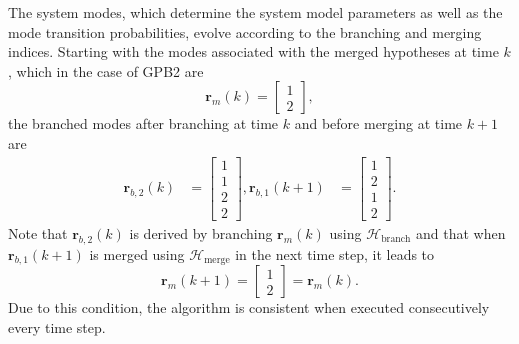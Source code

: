 {%
The system modes, which determine the system model parameters as well as the mode transition probabilities, evolve according to the branching and merging indices. Starting with the modes associated with the merged hypotheses at time $k$, which in the case of GPB2 are
%
\begin{equation} \label{eq:rmk_GPB2}
		\mathbf{r}_m(k) = \begin{bmatrix} 1 \\ 2 \end{bmatrix},
\end{equation}
the branched modes after branching at time $k$ and before merging at time $k+1$ are
%
%
\begin{equation} \label{eq:rbk_GPB2}
	\begin{aligned}
		\mathbf{r}_{b,2}(k) &= \begin{bmatrix} 1 \\ 1 \\ 2 \\ 2 \end{bmatrix},
		\mathbf{r}_{b,1}(k+1) &= \begin{bmatrix} 1 \\ 2 \\ 1 \\ 2 \end{bmatrix}.
	\end{aligned}
\end{equation}
Note that $\mathbf{r}_{b,2}(k)$ is derived by branching $\mathbf{r}_m(k)$ using $\mathcal{H}_{\text{branch}}$ and that when $\mathbf{r}_{b,1}(k+1)$ is merged using $\mathcal{H}_{\text{merge}}$ in the next time step, it leads to 
\begin{equation} \label{eq:rmkp1rmk_GPB2}
	\mathbf{r}_m(k+1) = \begin{bmatrix} 1 \\ 2 \end{bmatrix} = \mathbf{r}_m(k).
\end{equation}
Due to this condition, the algorithm is consistent when executed consecutively every time step.

}
